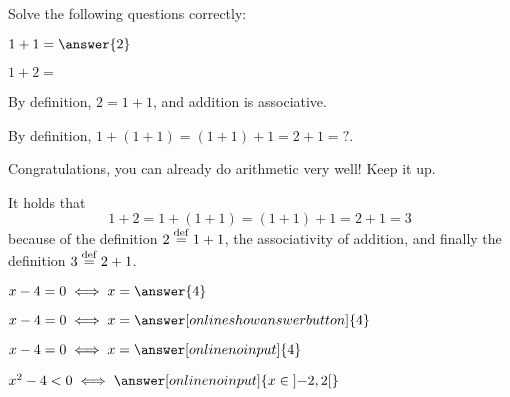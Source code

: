 \documentclass{ximera}
\begin{document}

    \begin{exercise} Solve the following questions correctly:
        \begin{question}
                $1+1 = \answer{2}$
        \end{question}    
        \begin{question}
            $1+2 = $ 
            \begin{hint}
                By definition, $2 = 1+1$, and addition is associative.
            \end{hint}
            \begin{hint}
                By definition, $1+(1+1) = (1+1) + 1 = 2 + 1 = ?$.
            \end{hint}
            \begin{feedback}[correct] 
                Congratulations, you can already do arithmetic very well! Keep it up. 
            \end{feedback}         
            \begin{oplossing} It holds that
                \[ 1 + 2 = 1 + (1 + 1) = (1 + 1) + 1 = 2 + 1 = 3 \]
                because of the definition $2\overset{\mathrm{def}}{=} 1+1$, the associativity of addition,
                and finally the definition $3\overset{\mathrm{def}}{=} 2+1$. 
            \end{oplossing}
        \end{question}

        \begin{question}$x-4 = 0
            \iff x = \answer{4}$
        \end{question}
        \begin{question}$x-4 = 0
            \iff x = \answer[onlineshowanswerbutton]{4}$
        \end{question}
        \begin{question}$x-4 = 0
            \iff x = \answer[onlinenoinput]{4}$
        \end{question}
        \begin{question}$x^2-4 < 0
            \iff \answer[onlinenoinput]{ x \in \left]-2,2\right[}$
        \end{question}

    \end{exercise}
\end{document}
